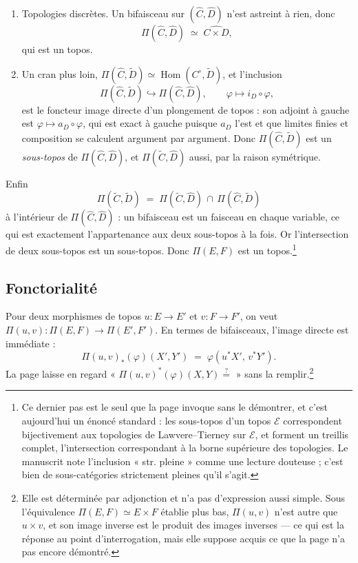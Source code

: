\documentclass[11pt,a4paper]{article}
\begin{document}
\begin{enumerate}
\item[a)] Topologies discrètes. Un bifaisceau sur $(\widehat{C}, \widehat{D})$
n'est astreint à rien, donc
\[
\Pi(\widehat{C}, \widehat{D}) \;\simeq\; \widehat{C \times D},
\]
qui est un topos.
\item[b)] Un cran plus loin, $\Pi(\widehat{C}, \widetilde{D}) \simeq
\operatorname{Hom}(C^{\circ}, \widetilde{D})$, et l'inclusion
\[
\Pi(\widehat{C}, \widetilde{D}) \hookrightarrow
\Pi(\widehat{C}, \widehat{D}), \qquad \varphi \longmapsto i_{D} \circ \varphi,
\]
est le foncteur image directe d'un plongement de topos : son adjoint à gauche
est $\varphi \mapsto a_{D} \circ \varphi$, qui est exact à gauche puisque
$a_{D}$ l'est et que limites finies et composition se calculent argument par
argument. Donc $\Pi(\widehat{C}, \widetilde{D})$ est un \emph{sous-topos} de
$\Pi(\widehat{C}, \widehat{D})$, et $\Pi(\widetilde{C}, \widehat{D})$ aussi,
par la raison symétrique.
\end{enumerate}

Enfin
\[
\Pi(\widetilde{C}, \widetilde{D}) \;=\; \Pi(\widetilde{C}, \widehat{D})
\,\cap\, \Pi(\widehat{C}, \widetilde{D})
\]
à l'intérieur de $\Pi(\widehat{C}, \widehat{D})$ : un bifaisceau est un
faisceau en chaque variable, ce qui est exactement l'appartenance aux deux
sous-topos à la fois. Or l'intersection de deux sous-topos est un sous-topos.
Donc $\Pi(E,F)$ est un topos.\footnote{Ce dernier pas est le seul que la page
invoque sans le démontrer, et c'est aujourd'hui un énoncé standard :
les sous-topos d'un topos $\mathcal{E}$ correspondent bijectivement aux
topologies de Lawvere--Tierney sur $\mathcal{E}$, et forment un treillis
complet, l'intersection correspondant à la borne supérieure des topologies.
Le manuscrit note l'inclusion « str. pleine » comme une lecture douteuse ;
c'est bien de sous-catégories strictement pleines qu'il s'agit.}

\subsection*{Fonctorialité}

Pour deux morphismes de topos $u : E \to E'$ et $v : F \to F'$, on veut
$\Pi(u,v) : \Pi(E,F) \to \Pi(E',F')$. En termes de bifaisceaux, l'image directe
est immédiate :
\[
\Pi(u,v)_{*}(\varphi)(X',Y') \;=\; \varphi(u^{*}X',\, v^{*}Y').
\]
La page laisse en regard « $\Pi(u,v)^{*}(\varphi)(X,Y) \overset{?}{=}$ » sans
la remplir.\footnote{Elle est déterminée par adjonction et n'a pas d'expression
aussi simple. Sous l'équivalence $\Pi(E,F) \simeq E \times F$ établie plus bas,
$\Pi(u,v)$ n'est autre que $u \times v$, et son image inverse est le produit
des images inverses — ce qui est la réponse au point d'interrogation, mais elle
suppose acquis ce que la page n'a pas encore démontré.}
\end{document}
